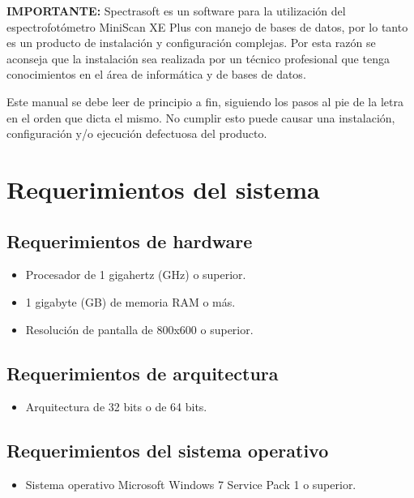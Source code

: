 \thispagestyle{empty}
\textbf{IMPORTANTE:} Spectrasoft es un software para la utilizaci\'{o}n del espectrofot\'{o}metro MiniScan XE Plus con manejo de bases de datos, por lo tanto es un producto de instalaci\'{o}n y configuraci\'{o}n complejas. Por esta raz\'{o}n se aconseja que la instalaci\'{o}n sea realizada por un t\'{e}cnico profesional que tenga conocimientos en el \'{a}rea de inform\'{a}tica y de bases de datos.

Este manual se debe leer de principio a fin, siguiendo los pasos al pie de la letra en el orden que dicta el mismo. No cumplir esto puede causar una instalaci\'{o}n, configuraci\'{o}n y/o ejecuci\'{o}n defectuosa del producto.
\newpage
\section{Requerimientos del sistema}

\subsection{Requerimientos de hardware}

	\begin{itemize}
		\item Procesador de 1 gigahertz (GHz) o superior.
		
		\item 1 gigabyte (GB) de memoria RAM o m\'{a}s.
		
		\item Resoluci\'{o}n de pantalla de 800x600 o superior.
	\end{itemize}
	
\subsection{Requerimientos de arquitectura}

	\begin{itemize}
		\item Arquitectura de 32 bits o de 64 bits.
	\end{itemize}

\subsection{Requerimientos del sistema operativo}

	\begin{itemize}
		\item Sistema operativo Microsoft Windows 7 Service Pack 1 o superior.
	\end{itemize}
	
